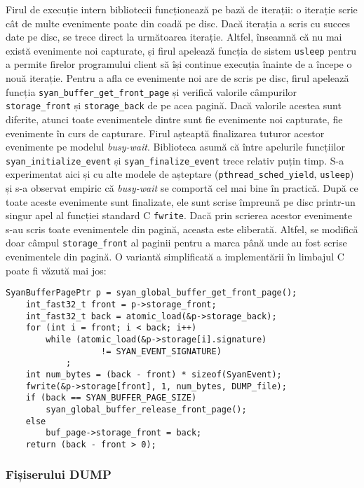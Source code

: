 Firul de execuție intern bibliotecii funcționează pe bază de iterații:
o iterație scrie cât de multe evenimente poate din coadă pe disc. Dacă
iterația a scris cu succes date pe disc, se trece direct la următoarea
iterație. Altfel, înseamnă că nu mai există evenimente noi capturate, și
firul apelează funcția de sistem \lstinline{usleep} pentru a permite
firelor programului client să își continue execuția înainte de a începe
o nouă iterație. Pentru a afla ce evenimente noi are de scris pe disc,
firul apelează funcția \lstinline{syan_buffer_get_front_page} și
verifică valorile câmpurilor \lstinline{storage_front} și
\lstinline{storage_back} de pe acea pagină. Dacă valorile acestea sunt
diferite, atunci toate evenimentele dintre sunt fie evenimente noi
capturate, fie evenimente în curs de capturare. Firul așteaptă
finalizarea tuturor acestor evenimente pe modelul \textit{busy-wait}.
Biblioteca asumă că între apelurile funcțiilor
\lstinline{syan_initialize_event} și \lstinline{syan_finalize_event}
trece relativ puțin timp. S-a experimentat aici și cu alte modele de
așteptare (\lstinline{pthread_sched_yield}, \lstinline{usleep}) și s-a
observat empiric că \textit{busy-wait} se comportă cel mai bine în
practică. După ce toate aceste evenimente sunt finalizate, ele sunt
scrise împreună pe disc printr-un singur apel al funcției standard C
\lstinline{fwrite}. Dacă prin scrierea acestor evenimente s-au scris
toate evenimentele din pagină, aceasta este eliberată. Altfel, se
modifică doar câmpul \lstinline{storage_front} al paginii pentru a marca
până unde au fost scrise evenimentele din pagină. O variantă
simplificată a implementării în limbajul C poate fi văzută mai jos:

\begin{lstlisting}[caption=Scrierea evenimentelor pe disc,
                   label=code:lib-write-events]
    SyanBufferPagePtr p = syan_global_buffer_get_front_page();
    int_fast32_t front = p->storage_front;
    int_fast32_t back = atomic_load(&p->storage_back);
    for (int i = front; i < back; i++)
        while (atomic_load(&p->storage[i].signature)
                   != SYAN_EVENT_SIGNATURE)
            ;
    int num_bytes = (back - front) * sizeof(SyanEvent);
    fwrite(&p->storage[front], 1, num_bytes, DUMP_file);
    if (back == SYAN_BUFFER_PAGE_SIZE)
        syan_global_buffer_release_front_page();
    else
        buf_page->storage_front = back;
    return (back - front > 0);
\end{lstlisting}

\subsubsection{Fișiserului DUMP}\label{dump-file}

